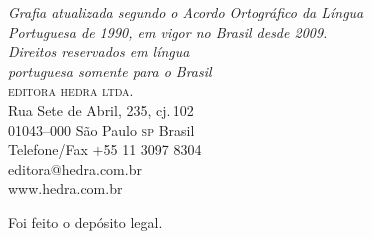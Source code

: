 \mbox{}\vfill

\textit{Grafia atualizada segundo o Acordo Ortográfico da Língua\\
Portuguesa de 1990, em vigor no Brasil desde 2009.}\\

\textit{Direitos reservados em língua\\ 
portuguesa somente para o Brasil}\\

\textsc{editora hedra ltda.}\\
Rua Sete de Abril, 235, cj.\,102\\
01043--000 São Paulo \textsc{sp} Brasil\\
Telefone/Fax +55 11 3097 8304\\\smallskip
editora@hedra.com.br\\
www.hedra.com.br\\
\bigskip

Foi feito o depósito legal.

\endgroup
\pagebreak
